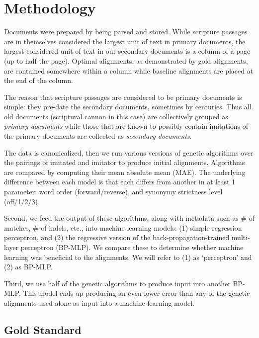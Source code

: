 \section {Methodology}
Documents were prepared by being parsed and stored. While scripture passages are in themselves considered the largest unit of text in primary documents, the largest considered unit of text in our secondary documents is a column of a page (up to half the page). Optimal alignments, as demonstrated by gold alignments, are contained somewhere within a column while baseline alignments are placed at the end of the column.

The reason that scripture passages are considered to be primary documents is simple: they pre-date the secondary documents, sometimes by centuries. Thus all old documents (scriptural cannon in this case) are collectively grouped as \textit{primary documents} while those that are known to possibly contain imitations of the primary documents are collected as \textit{secondary documents}.

The data is canonicalized, then we run various versions of genetic algorithms over the pairings of imitated and imitator to produce initial alignments. Algorithms are compared by computing their mean absolute mean (MAE).
The underlying difference between each model is that each differs from another in at least 1 parameter: word order (forward/reverse), and synonymy strictness level (off/1/2/3).

Second, we feed the output of these algorithms, along with metadata such as \# of matches, \# of indels, etc., into machine learning models: (1) simple regression perceptron, and (2) the regressive version of the back-propagation-trained multi-layer perceptron (BP-MLP). We compare these to determine whether machine learning was beneficial to the alignments. We will refer to (1) as `perceptron' and (2) as BP-MLP.

Third, we use half of the genetic algorithms to produce input into another BP-MLP. This model ends up producing an even lower error than any of the genetic alignments used alone as input into a machine learning model.

\subsection{Gold Standard}
